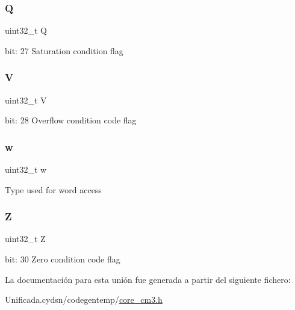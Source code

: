 \subsubsection{\texorpdfstring{Q}{Q}}
{\footnotesize\ttfamily uint32\+\_\+t Q}

bit\+: 27 Saturation condition flag \mbox{\label{union_a_p_s_r___type_acd4a2b64faee91e4a9eef300667fa222}} 
\subsubsection{\texorpdfstring{V}{V}}
{\footnotesize\ttfamily uint32\+\_\+t V}

bit\+: 28 Overflow condition code flag \mbox{\label{union_a_p_s_r___type_ad0fb62e7a08e70fc5e0a76b67809f84b}} 
\subsubsection{\texorpdfstring{w}{w}}
{\footnotesize\ttfamily uint32\+\_\+t w}

Type used for word access \mbox{\label{union_a_p_s_r___type_a5ae954cbd9986cd64625d7fa00943c8e}} 
\subsubsection{\texorpdfstring{Z}{Z}}
{\footnotesize\ttfamily uint32\+\_\+t Z}

bit\+: 30 Zero condition code flag 

La documentación para esta unión fue generada a partir del siguiente fichero\+:\begin{DoxyCompactItemize}
\item 
Unificada.\+cydsn/codegentemp/\mbox{\hyperlink{core__cm3_8h}{core\+\_\+cm3.\+h}}\end{DoxyCompactItemize}
